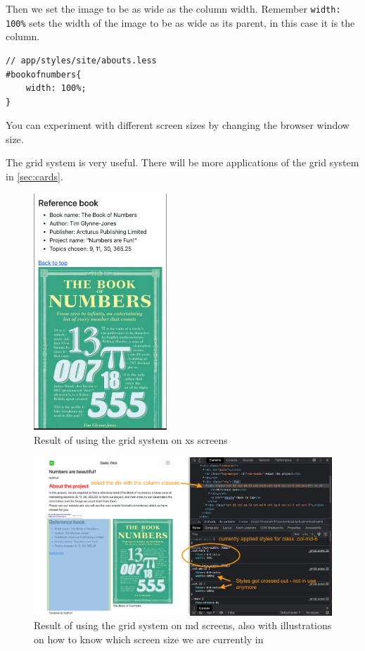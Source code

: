 Then we set the image to be as wide as the column width. Remember \texttt{width: 100\%} sets the width of the image to be as wide as its parent, in this case it is the column.

\begin{lstlisting}[language=pug]
// app/styles/site/abouts.less
#bookofnumbers{
    width: 100%;
}
\end{lstlisting}

You can experiment with different screen sizes by changing the browser window size.

The grid system is very useful. There will be more applications of the grid system in \cref{sec:cards}.

\begin{figure}[H]
\centering
\includegraphics[width=5cm]{images/chn6-grid-xs.png}
\caption{Result of using the grid system on xs screens}
\end{figure}

\begin{figure}[H]
\centering
\includegraphics[width=15cm]{images/chn6-grid-md.png}
\caption{Result of using the grid system on md screens, also with illustrations on how to know which screen size we are currently in}
\end{figure}


